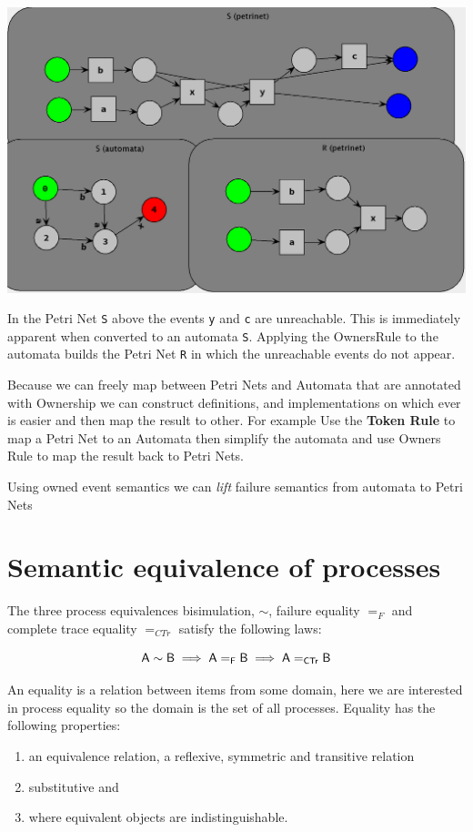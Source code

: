 \documentclass[]{article}
\begin{document}
\begin{minipage}{0.9\textwidth}
\begin{center}\includegraphics[scale=0.4]{ReachNets.png}\end{center}
\end{minipage}

 In the Petri Net \verb|S| above the events \verb|y| and \verb|c| are unreachable. This is immediately apparent when converted to an automata \verb|S|. Applying the OwnersRule to the automata builds the Petri Net \verb|R| in which the unreachable events do not appear.



Because we can freely map between Petri Nets and Automata that are annotated with Ownership we can construct definitions, and implementations on which ever is easier and then map the result to other.  For example 
 Use the {\bf Token Rule} to map a Petri Net to an Automata then  simplify the automata and use {\sf Owners Rule } to map the result  back  to Petri Nets.

Using {\sf owned event} semantics we can \emph{lift} failure semantics from automata to Petri Nets



\section{Semantic equivalence  of processes}
 The three process equivalences bisimulation, $\sim$, failure equality $=_F$ and complete trace equality $=_{CTr}$ satisfy the following laws:

\[ \sf A\sim B \implies A=_F B \implies A=_{CTr}B  \]

  An equality is a relation between  items from some domain, here we are interested in process equality so the domain is the set of all processes. Equality has the following properties:
 \begin{enumerate}
 \item an equivalence relation, a reflexive, symmetric and transitive relation
 \item substitutive and
 \item where equivalent objects are indistinguishable.
 \end{enumerate}
\end{document}
